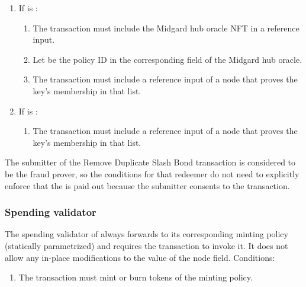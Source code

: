 \documentclass[../midgard.tex]{subfiles}
\begin{document}
\begin{description}
\begin{enumerate}
\begin{enumerate}
                \end{enumerate}
            \item If  is :
                \begin{enumerate}
                    \item The transaction must include the Midgard hub oracle NFT in a reference input.
                    \item Let  be the policy ID in the corresponding field of the Midgard hub oracle.
                    \item The transaction must include a reference input of a  node that proves the  key's membership in that list.
                \end{enumerate}
            \item If  is :
                \begin{enumerate}
                    \item The transaction must include a reference input of a  node that proves the  key's membership in that list.
                \end{enumerate}
        \end{enumerate}
    The submitter of the Remove Duplicate Slash Bond transaction is considered to be the fraud prover, so the conditions for that redeemer do not need to explicitly enforce that the  is paid out because the submitter consents to the transaction.
\end{description}

\subsubsection{Spending validator}
\label{h:registered-operators-spending-validator}

The spending validator of  always forwards to its corresponding minting policy (statically parametrized) and requires the transaction to invoke it. It does not allow any in-place modifications to the  value of the node  field. Conditions:
\begin{enumerate}
    \item The transaction must mint or burn tokens of the  minting policy.
\end{enumerate}
\end{document}
